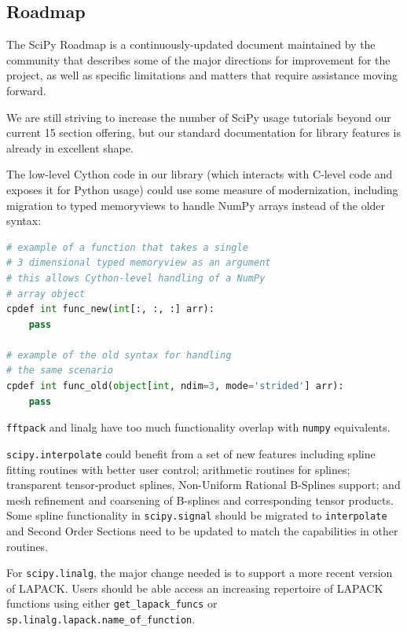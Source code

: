 \documentclass[fleqn,10pt]{wlscirep}
\begin{document}
\subsection*{Roadmap}

The SciPy Roadmap\cite{SciPy_roadmap} is a continuously-updated document
maintained by the community that describes some of the major directions for
improvement for the project, as well as specific limitations and matters that
require assistance moving forward.

We are still striving to increase the number of SciPy usage tutorials beyond
our current 15 section offering\cite{SciPy_tutorials}, but our standard
documentation for library features is already in excellent shape.

The low-level Cython code in our library (which interacts with C-level code and
exposes it for Python usage) could use some measure of modernization, including
migration to typed memoryviews to handle NumPy arrays instead of the older
syntax:

\begin{lstlisting}[language=Python]
# example of a function that takes a single
# 3 dimensional typed memoryview as an argument
# this allows Cython-level handling of a NumPy
# array object
cpdef int func_new(int[:, :, :] arr):
    pass

# example of the old syntax for handling
# the same scenario
cpdef int func_old(object[int, ndim=3, mode='strided'] arr):
    pass
\end{lstlisting}

\texttt{fftpack} and {linalg} have too much functionality overlap with
\texttt{numpy} equivalents.

\texttt{scipy.interpolate} could benefit from a set of new features including
spline fitting routines with better user control; arithmetic routines for
splines; transparent tensor-product splines, Non-Uniform Rational B-Splines
support; and mesh refinement and coarsening of B-splines and corresponding
tensor products.  Some spline functionality in \texttt{scipy.signal} should be
migrated to \texttt{interpolate} and Second Order Sections need to be updated
to match the capabilities in other routines.

For \texttt{scipy.linalg}, the major change needed is to support a more recent
version of LAPACK. Users should be able access an increasing repertoire of
LAPACK functions using either \texttt{get\_lapack\_funcs} or
\texttt{sp.linalg.lapack.name\_of\_function}.
\end{document}

